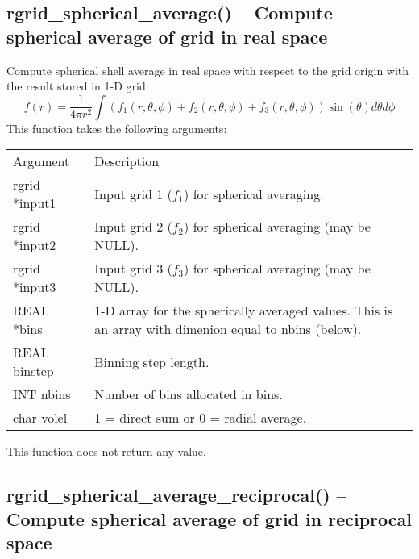 \documentclass[12pt,letterpaper]{report}
\begin{document}
\subsection{rgrid\_spherical\_average() -- Compute spherical average of grid in real space}

Compute spherical shell average in real space with respect to the grid origin with the result stored in 1-D grid:
$$f(r) = \frac{1}{4\pi r^2}\int \left(f_1(r, \theta, \phi) + f_2(r, \theta, \phi) + f_3(r, \theta, \phi)\right) \sin(\theta) d\theta d\phi$$
This function takes the following arguments:
\begin{longtable}{p{} p{}}
Argument & Description\\
\cline{1-2}
rgrid *input1 & Input grid 1 ($f_1$) for spherical averaging.\\
rgrid *input2 & Input grid 2 ($f_2$) for spherical averaging (may be NULL).\\
rgrid *input3 & Input grid 3 ($f_3$) for spherical averaging (may be NULL).\\
REAL *bins & 1-D array for the spherically averaged values. This is an array with dimenion equal to nbins (below).\\
REAL binstep & Binning step length.\\
INT nbins & Number of bins allocated in bins.\\
char volel & 1 = direct sum or 0 = radial average.\\
\end{longtable}
\noindent
This function does not return any value.

\subsection{rgrid\_spherical\_average\_reciprocal() -- Compute spherical average of grid in reciprocal space}
\end{document}
